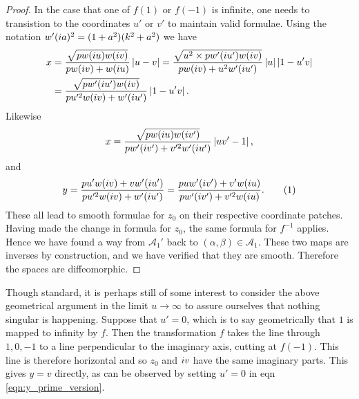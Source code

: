 \begin{lem}
\begin{proof}
In the case that one of $f(1)$ or $f(-1)$ is infinite, one needs to transistion to the coordinates $u'$ or $v'$ to maintain valid formulae. Using the notation $w'(i a)^2 = (1+a^2)(k^2 + a^2)$ we have
\begin{align*}
x
&= \frac{\sqrt{pw(i u)w(i v)}}{pw(i v) + w(i u)} \left|u-v\right|
= \frac{\sqrt{u^2 \times pw'(i u')w(i v)}}{pw(i v) + u^2 w'(i u')} \left|u\right|\left|1-u'v\right| \\
&= \frac{\sqrt{pw'(i u')w(i v)}}{pu'^2w(i v) + w'(i u')} \left|1-u'v\right|.
\end{align*}
Likewise
\[
x
= \frac{\sqrt{pw(i u)w(i v')}}{pw'(i v') + v'^2w'(i u')} \left|uv'-1\right|,
\]
and
\[
y
= \frac{pu'w(\iu v) + vw'(\iu u')}{pu'^2w(\iu v) + w'(\iu u')}
= \frac{puw'(\iu v') + v'w(\iu u)}{pw'(\iu v') + v'^2w(\iu u)}. \labelthis{eqn:y_prime_version}
\]
These all lead to smooth formulae for $z_0$ on their respective coordinate patches. Having made the change in formula for $z_0$, the same formula for $f^{-1}$ applies. Hence we have found a way from $\mathcal{A}_1'$ back to $(α,β) \in \mathcal{A}_1$. These two maps are inverses by construction, and we have verified that they are smooth. Therefore the spaces are diffeomorphic.
\end{proof}
\end{lem}

Though standard, it is perhaps still of some interest to consider the above geometrical argument in the limit $u\to\infty$ to assure ourselves that nothing singular is happening. Suppose that $u' = 0$, which is to say geometrically that $1$ is mapped to infinity by $f$. Then the transformation $f$ takes the line through $1,0,-1$ to a line perpendicular to the imaginary axis, cutting at $f(-1)$. This line is therefore horizontal and so $z_0$ and $i v$ have the same imaginary parts. This gives $y=v$ directly, as can be observed by setting $u'=0$ in eqn \eqref{eqn:y_prime_version}.

